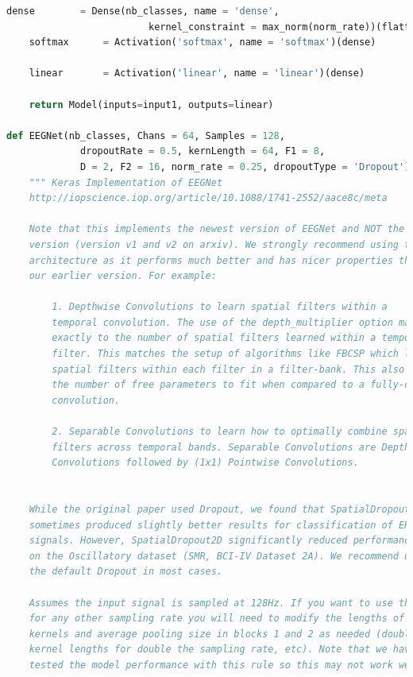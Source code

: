 \documentclass[conference]{IEEEtran}
\begin{document}
\begin{lstlisting}[language=Python, caption=Machine Learning Model, label=ml_model]
    dense        = Dense(nb_classes, name = 'dense', 
                         kernel_constraint = max_norm(norm_rate))(flatten)
    softmax      = Activation('softmax', name = 'softmax')(dense)

    linear       = Activation('linear', name = 'linear')(dense)
    
    return Model(inputs=input1, outputs=linear)

def EEGNet(nb_classes, Chans = 64, Samples = 128, 
             dropoutRate = 0.5, kernLength = 64, F1 = 8, 
             D = 2, F2 = 16, norm_rate = 0.25, dropoutType = 'Dropout'):
    """ Keras Implementation of EEGNet
    http://iopscience.iop.org/article/10.1088/1741-2552/aace8c/meta

    Note that this implements the newest version of EEGNet and NOT the earlier
    version (version v1 and v2 on arxiv). We strongly recommend using this
    architecture as it performs much better and has nicer properties than
    our earlier version. For example:
        
        1. Depthwise Convolutions to learn spatial filters within a 
        temporal convolution. The use of the depth_multiplier option maps 
        exactly to the number of spatial filters learned within a temporal
        filter. This matches the setup of algorithms like FBCSP which learn 
        spatial filters within each filter in a filter-bank. This also limits 
        the number of free parameters to fit when compared to a fully-connected
        convolution. 
        
        2. Separable Convolutions to learn how to optimally combine spatial
        filters across temporal bands. Separable Convolutions are Depthwise
        Convolutions followed by (1x1) Pointwise Convolutions. 
        
    
    While the original paper used Dropout, we found that SpatialDropout2D 
    sometimes produced slightly better results for classification of ERP 
    signals. However, SpatialDropout2D significantly reduced performance 
    on the Oscillatory dataset (SMR, BCI-IV Dataset 2A). We recommend using
    the default Dropout in most cases.
        
    Assumes the input signal is sampled at 128Hz. If you want to use this model
    for any other sampling rate you will need to modify the lengths of temporal
    kernels and average pooling size in blocks 1 and 2 as needed (double the 
    kernel lengths for double the sampling rate, etc). Note that we haven't 
    tested the model performance with this rule so this may not work well. 
    

\end{lstlisting}
\end{document}

